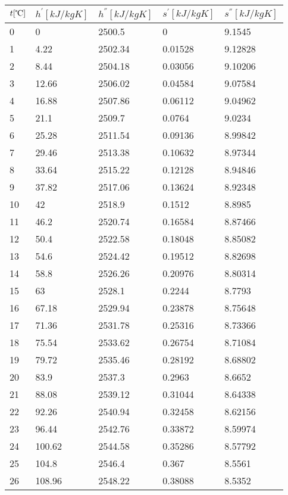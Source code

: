 \documentclass[twocolumn]{article}
\begin{document}
\begin{tabular}{l|l|l|l|l}
	$t [\text{\textcelsius}] $ & $h^{'} [kJ/kg K]$ & $h^{''} [kJ/kg K]$ & $s^{'} [kJ/kg K] $ & $s^{''} [kJ/kg K]$ \\ \hline
0	&	0	&	2500.5	&	0	&	9.1545 \\ \hline
1	&	4.22	&	2502.34	&	0.01528	&	9.12828 \\ \hline
2	&	8.44	&	2504.18	&	0.03056	&	9.10206 \\ \hline
3	&	12.66	&	2506.02	&	0.04584	&	9.07584 \\ \hline
4	&	16.88	&	2507.86	&	0.06112	&	9.04962 \\ \hline
5	&	21.1	&	2509.7	&	0.0764	&	9.0234 \\ \hline
6	&	25.28	&	2511.54	&	0.09136	&	8.99842 \\ \hline
7	&	29.46	&	2513.38	&	0.10632	&	8.97344 \\ \hline
8	&	33.64	&	2515.22	&	0.12128	&	8.94846 \\ \hline
9	&	37.82	&	2517.06	&	0.13624	&	8.92348 \\ \hline
10	&	42	&	2518.9	&	0.1512	&	8.8985 \\ \hline
11	&	46.2	&	2520.74	&	0.16584	&	8.87466 \\ \hline
12	&	50.4	&	2522.58	&	0.18048	&	8.85082 \\ \hline
13	&	54.6	&	2524.42	&	0.19512	&	8.82698 \\ \hline
14	&	58.8	&	2526.26	&	0.20976	&	8.80314 \\ \hline
15	&	63	&	2528.1	&	0.2244	&	8.7793 \\ \hline
16	&	67.18	&	2529.94	&	0.23878	&	8.75648 \\ \hline
17	&	71.36	&	2531.78	&	0.25316	&	8.73366 \\ \hline
18	&	75.54	&	2533.62	&	0.26754	&	8.71084 \\ \hline
19	&	79.72	&	2535.46	&	0.28192	&	8.68802 \\ \hline
20	&	83.9	&	2537.3	&	0.2963	&	8.6652 \\ \hline
21	&	88.08	&	2539.12	&	0.31044	&	8.64338 \\ \hline
22	&	92.26	&	2540.94	&	0.32458	&	8.62156 \\ \hline
23	&	96.44	&	2542.76	&	0.33872	&	8.59974 \\ \hline
24	&	100.62	&	2544.58	&	0.35286	&	8.57792 \\ \hline
25	&	104.8	&	2546.4	&	0.367	&	8.5561 \\ \hline
26	&	108.96	&	2548.22	&	0.38088	&	8.5352 \\ \hline

\end{tabular}
\end{document}
